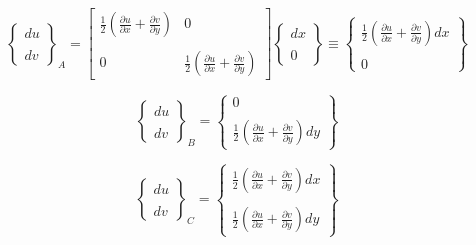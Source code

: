 \documentclass[../notas medios.tex]{subfiles}
\begin{document}
\[{\left\{ {\begin{array}{*{20}{c}}
{du}\\\\
{dv}
\end{array}} \right\}_A} = \left[ {\begin{array}{*{20}{c}}
{\frac{1}{2}\left( {\frac{{\partial u}}{{\partial x}} + \frac{{\partial v}}{{\partial y}}} \right)}&0\\\\
0&{\frac{1}{2}\left( {\frac{{\partial u}}{{\partial x}} + \frac{{\partial v}}{{\partial y}}} \right)}
\end{array}} \right]\left\{ {\begin{array}{*{20}{c}}
{dx}\\\\
0
\end{array}} \right\} \equiv \left\{ {\begin{array}{*{20}{c}}
{\frac{1}{2}\left( {\frac{{\partial u}}{{\partial x}} + \frac{{\partial v}}{{\partial y}}} \right)dx}\\\\
0
\end{array}} \right\}\]

\[{\left\{ {\begin{array}{*{20}{c}}
{du}\\\\
{dv}
\end{array}} \right\}_B} = \left\{ {\begin{array}{*{20}{c}}
0\\\\
{\frac{1}{2}\left( {\frac{{\partial u}}{{\partial x}} + \frac{{\partial v}}{{\partial y}}} \right)dy}
\end{array}} \right\}\]

\[{\left\{ {\begin{array}{*{20}{c}}
{du}\\\\
{dv}
\end{array}} \right\}_C} = \left\{ {\begin{array}{*{20}{c}}
{\frac{1}{2}\left( {\frac{{\partial u}}{{\partial x}} + \frac{{\partial v}}{{\partial y}}} \right)dx}\\\\
{\frac{1}{2}\left( {\frac{{\partial u}}{{\partial x}} + \frac{{\partial v}}{{\partial y}}} \right)dy}
\end{array}} \right\}\]
\end{document}
